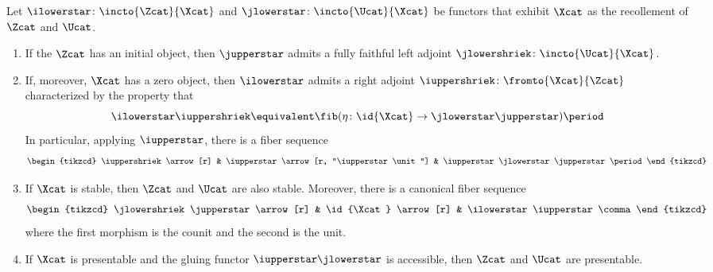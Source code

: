 \begin{theorem}\label{thm:stabrecollement}
	Let $ \ilowerstar \colon \incto{\Zcat}{\Xcat} $ and $ \jlowerstar \colon \incto{\Ucat}{\Xcat} $ be functors that exhibit $ \Xcat $ as the recollement of $ \Zcat $ and $ \Ucat $.
	\begin{enumerate}
		\item\label{thm:stabrecollement.1} If the \category $ \Zcat $ has an initial object, then $ \jupperstar $ admits a fully faithful left adjoint $ \jlowershriek \colon \incto{\Ucat}{\Xcat} $.

		\item\label{thm:stabrecollement.2} If, moreover, $ \Xcat $ has a zero object, then $ \ilowerstar $ admits a right adjoint $ \iuppershriek \colon \fromto{\Xcat}{\Zcat} $ characterized by the property that 
		\begin{equation*}
			\ilowerstar\iuppershriek \equivalent \fib(\eta \colon \id{\Xcat} \to \jlowerstar\jupperstar) \period
		\end{equation*}
		In particular, applying $ \iupperstar $, there is a fiber sequence
		\begin{equation*}
			\begin{tikzcd}
				\iuppershriek \arrow[r] & \iupperstar \arrow[r, "\iupperstar\unit"] & \iupperstar\jlowerstar\jupperstar \period
			\end{tikzcd}
		\end{equation*}

		\item\label{thm:stabrecollement.3} If $ \Xcat $ is stable, then $ \Zcat $ and $ \Ucat $ are also stable.
		Moreover, there is a canonical fiber sequence
		\begin{equation*}
			\begin{tikzcd}
				\jlowershriek \jupperstar \arrow[r] & \id{\Xcat} \arrow[r] & \ilowerstar \iupperstar \comma
			\end{tikzcd}
		\end{equation*}
		where the first morphism is the counit and the second is the unit.

		\item\label{thm:stabrecollement.4} If $ \Xcat $ is presentable and the gluing functor $ \iupperstar \jlowerstar $ is accessible, then $ \Zcat $ and $ \Ucat $ are presentable.
	\end{enumerate}
\end{theorem}

